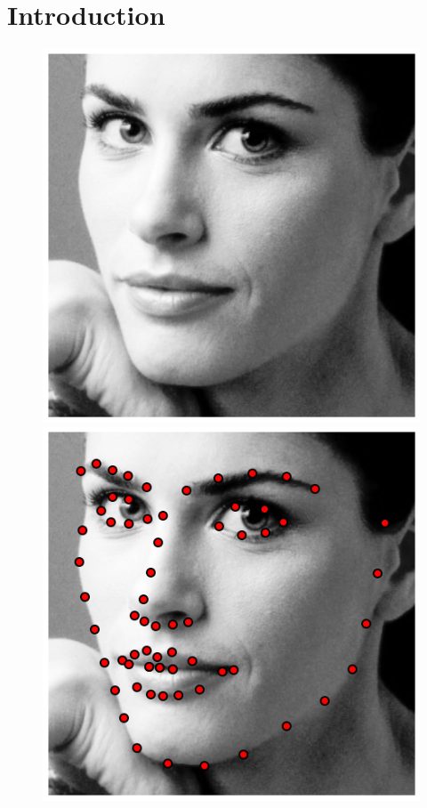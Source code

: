 \chapter{Introduction}
\minitoc

\begin{figure}[ht]
    \centering
    \includegraphics[width=\textwidth]{resources/Annotation_Correction/Fig_Intro/intro_0_0}
    \hfill
    \includegraphics[width=\textwidth]{resources/Annotation_Correction/Fig_Intro/intro_0_1}

\end{figure}
